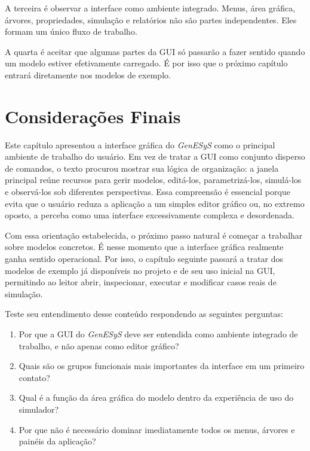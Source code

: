 A terceira é observar a interface como ambiente integrado. Menus, área gráfica, árvores, propriedades, simulação e relatórios não são partes independentes. Eles formam um único fluxo de trabalho.

A quarta é aceitar que algumas partes da GUI só passarão a fazer sentido quando um modelo estiver efetivamente carregado. É por isso que o próximo capítulo entrará diretamente nos modelos de exemplo.

\section{Considerações Finais}
\label{sec:cap3_consideracoes_finais}

Este capítulo apresentou a interface gráfica do \textit{GenESyS} como o principal ambiente de trabalho do usuário. Em vez de tratar a GUI como conjunto disperso de comandos, o texto procurou mostrar sua lógica de organização: a janela principal reúne recursos para gerir modelos, editá-los, parametrizá-los, simulá-los e observá-los sob diferentes perspectivas. Essa compreensão é essencial porque evita que o usuário reduza a aplicação a um simples editor gráfico ou, no extremo oposto, a perceba como uma interface excessivamente complexa e desordenada.

Com essa orientação estabelecida, o próximo passo natural é começar a trabalhar sobre modelos concretos. É nesse momento que a interface gráfica realmente ganha sentido operacional. Por isso, o capítulo seguinte passará a tratar dos modelos de exemplo já disponíveis no projeto e de seu uso inicial na GUI, permitindo ao leitor abrir, inspecionar, executar e modificar casos reais de simulação.

Teste seu entendimento desse conteúdo respondendo as seguintes perguntas:

\begin{enumerate}
    \item Por que a GUI do \textit{GenESyS} deve ser entendida como ambiente integrado de trabalho, e não apenas como editor gráfico?

    \item Quais são os grupos funcionais mais importantes da interface em um primeiro contato?

    \item Qual é a função da área gráfica do modelo dentro da experiência de uso do simulador?

    \item Por que não é necessário dominar imediatamente todos os menus, árvores e painéis da aplicação?
\end{enumerate}